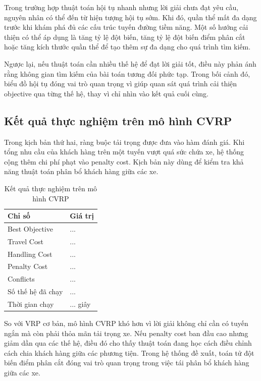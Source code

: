 \documentclass[12pt,a4paper]{article}
\numberwithin{figure}{subsection}
\begin{document}
Trong trường hợp thuật toán hội tụ nhanh nhưng lời giải chưa đạt yêu cầu, nguyên nhân có thể đến từ hiện tượng hội tụ sớm. Khi đó, quần thể mất đa dạng trước khi khám phá đủ các cấu trúc tuyến đường tiềm năng. Một số hướng cải thiện có thể áp dụng là tăng tỷ lệ đột biến, tăng tỷ lệ đột biến điểm phân cắt hoặc tăng kích thước quần thể để tạo thêm sự đa dạng cho quá trình tìm kiếm.

Ngược lại, nếu thuật toán cần nhiều thế hệ để đạt lời giải tốt, điều này phản ánh rằng không gian tìm kiếm của bài toán tương đối phức tạp. Trong bối cảnh đó, biểu đồ hội tụ đóng vai trò quan trọng vì giúp quan sát quá trình cải thiện objective qua từng thế hệ, thay vì chỉ nhìn vào kết quả cuối cùng.

\subsection{Kết quả thực nghiệm trên mô hình CVRP}

Trong kịch bản thứ hai, ràng buộc tải trọng được đưa vào hàm đánh giá. Khi tổng nhu cầu của khách hàng trên một tuyến vượt quá sức chứa xe, hệ thống cộng thêm chi phí phạt vào penalty cost. Kịch bản này dùng để kiểm tra khả năng thuật toán phân bổ khách hàng giữa các xe.

\begin{table}[H]
    \centering
    \caption{Kết quả thực nghiệm trên mô hình CVRP}
    \label{tab:cvrp_result}
    \renewcommand{\arraystretch}{1.35}
    \begin{tabular}{|p{6cm}|p{6cm}|}
        \hline
        \textbf{Chỉ số} & \textbf{Giá trị} \\
        \hline
        Best Objective & ... \\
        \hline
        Travel Cost & ... \\
        \hline
        Handling Cost & ... \\
        \hline
        Penalty Cost & ... \\
        \hline
        Conflicts & ... \\
        \hline
        Số thế hệ đã chạy & ... \\
        \hline
        Thời gian chạy & ... giây \\
        \hline
    \end{tabular}
\end{table}

So với VRP cơ bản, mô hình CVRP khó hơn vì lời giải không chỉ cần có tuyến ngắn mà còn phải thỏa mãn tải trọng xe. Nếu penalty cost ban đầu cao nhưng giảm dần qua các thế hệ, điều đó cho thấy thuật toán đang học cách điều chỉnh cách chia khách hàng giữa các phương tiện. Trong hệ thống đề xuất, toán tử đột biến điểm phân cắt đóng vai trò quan trọng trong việc tái phân bổ khách hàng giữa các xe.
\end{document}
